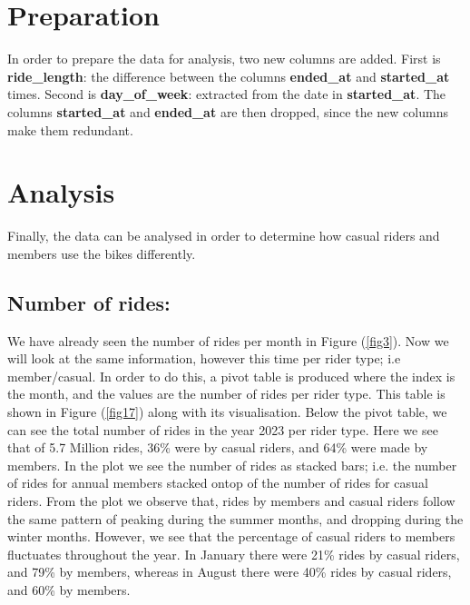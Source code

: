\documentclass[12pt]{article}
\begin{document}
	
\section{Preparation}
In order to prepare the data for analysis, two new columns are added. First is \textbf{ride\_length}: the difference between the columns \textbf{ended\_at} and \textbf{started\_at} times. Second is \textbf{day\_of\_week}: extracted from the date in \textbf{started\_at}. The columns \textbf{started\_at} and \textbf{ended\_at} are then dropped, since the new columns make them redundant.
	

\section{Analysis}
Finally, the data can be analysed in order to determine how casual riders and members use the bikes differently.

\subsection{Number of rides:}
We have already seen the number of rides per month in Figure (\underline{\ref{fig3}}). Now we will look at the same information, however this time per rider type; i.e member/casual. In order to do this, a pivot table is produced where the index is the month, and the values are the number of rides per rider type. This table is shown in Figure (\underline{\ref{fig17}}) along with its visualisation. Below the pivot table, we can see the total number of rides in the year 2023 per rider type. Here we see that of 5.7 Million rides, 36\% were by casual riders, and 64\% were made by members. In the plot we see the number of rides as stacked bars; i.e. the number of rides for annual members stacked ontop of the number of rides for casual riders.  From the plot we observe that, rides by members and casual riders follow the same pattern of peaking during the summer months, and dropping during the winter months. However, we see that the percentage of casual riders to members fluctuates throughout the year. In January there were 21\% rides by casual riders, and 79\% by members, whereas in August there were 40\% rides by casual riders, and 60\% by members. \\
\newline
\end{document}
